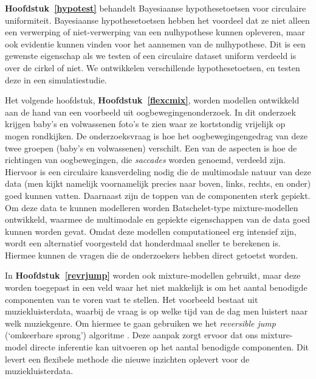 \documentclass[12pt, a4paper]{book}\usepackage[]{graphicx}\usepackage[]{color}
\begin{document}
\textbf{Hoofdstuk~\ref{hypotest}} behandelt Bayesiaanse hypothesetoetsen voor circulaire uniformiteit. Bayesiaanse hypothesetoetsen hebben het voordeel dat ze niet alleen een verwerping of niet-verwerping van een nulhypothese kunnen opleveren, maar ook evidentie kunnen vinden voor het aannemen van de nulhypothese. Dit is een gewenste eigenschap als we testen of een circulaire dataset uniform verdeeld is over de cirkel of niet. We ontwikkelen verschillende hypothesetoetsen, en testen deze in een simulatiestudie.

Het volgende hoofdstuk, \textbf{Hoofdstuk~\ref{flexcmix}}, worden modellen ontwikkeld aan de hand van een voorbeeld uit oogbewegingenonderzoek. In dit onderzoek krijgen baby's en volwassenen foto's te zien waar ze kortstondig vrijelijk op mogen rondkijken. De onderzoeksvraag is hoe het oogbewegingengedrag van deze twee groepen (baby's en volwassenen) verschilt. Een van de aspecten is hoe de richtingen van oogbewegingen, die \textit{saccades} worden genoemd, verdeeld zijn. Hiervoor is een circulaire kansverdeling nodig die de multimodale natuur van deze data (men kijkt namelijk voornamelijk precies naar boven, links, rechts, en onder) goed kunnen vatten. Daarnaast zijn de toppen van de componenten sterk gepiekt. Om deze data te kunnen modelleren worden Batschelet-type mixture-modellen ontwikkeld, waarmee de multimodale en gepiekte eigenschappen van de data goed kunnen worden gevat. Omdat deze modellen computationeel erg intensief zijn, wordt een alternatief voorgesteld dat honderdmaal sneller te berekenen is. Hiermee kunnen de vragen die de onderzoekers hebben direct getoetst worden.

In \textbf{Hoofdstuk~\ref{revrjump}} worden ook mixture-modellen gebruikt, maar deze worden toegepast in een veld waar het niet makkelijk is om het aantal benodigde componenten van te voren vast te stellen. Het voorbeeld bestaat uit muziekluisterdata, waarbij de vraag is op welke tijd van de dag men luistert naar welk muziekgenre. Om hiermee te gaan gebruiken we het \textit{reversible jump} (`omkeerbare sprong') algoritme \citep{richardson1997bayesian}. Deze aanpak zorgt ervoor dat ons mixture-model directe inferentie kan uitvoeren op het aantal benodigde componenten. Dit levert een flexibele methode die nieuwe inzichten oplevert voor de muziekluisterdata.
\end{document}
